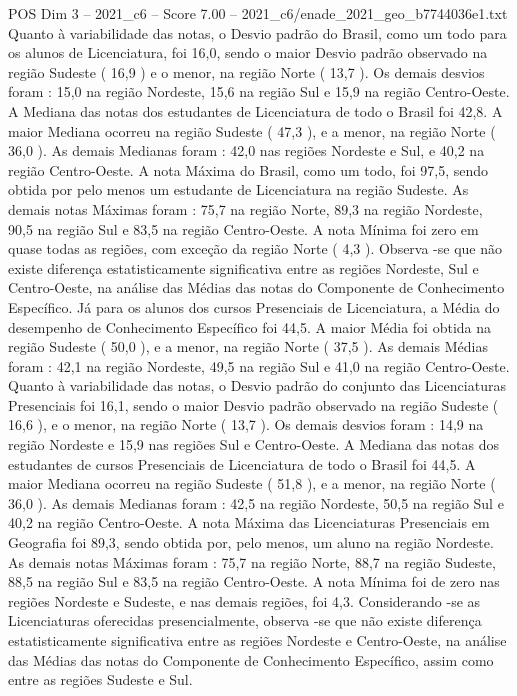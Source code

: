 \begin{textsample}{POS Dim 3 – 2021\_c6 – Score 7.00 – 2021\_c6/enade\_2021\_geo\_b7744036e1.txt}
Quanto à variabilidade das notas, o Desvio padrão do Brasil, como um todo para os alunos de Licenciatura, foi 16,0, sendo o maior Desvio padrão observado na região Sudeste ( 16,9 ) e o menor, na região Norte ( 13,7 ).
Os demais desvios foram : 15,0 na região Nordeste, 15,6 na região Sul e 15,9 na região Centro-Oeste.
A Mediana das notas dos estudantes de Licenciatura de todo o Brasil foi 42,8.
A maior Mediana ocorreu na região Sudeste ( 47,3 ), e a menor, na região Norte ( 36,0 ).
As demais Medianas foram : 42,0 nas regiões Nordeste e Sul, e 40,2 na região Centro-Oeste.
A nota Máxima do Brasil, como um todo, foi 97,5, sendo obtida por pelo menos um estudante de Licenciatura na região Sudeste.
As demais notas Máximas foram : 75,7 na região Norte, 89,3 na região Nordeste, 90,5 na região Sul e 83,5 na região Centro-Oeste.
A nota Mínima foi zero em quase todas as regiões, com exceção da região Norte ( 4,3 ).
Observa -se que não existe diferença estatisticamente significativa entre as regiões Nordeste, Sul e Centro-Oeste, na análise das Médias das notas do Componente de Conhecimento Específico.
Já para os alunos dos cursos Presenciais de Licenciatura, a Média do desempenho de Conhecimento Específico foi 44,5.
A maior Média foi obtida na região Sudeste ( 50,0 ), e a menor, na região Norte ( 37,5 ).
As demais Médias foram : 42,1 na região Nordeste, 49,5 na região Sul e 41,0 na região Centro-Oeste.
Quanto à variabilidade das notas, o Desvio padrão do conjunto das Licenciaturas Presenciais foi 16,1, sendo o maior Desvio padrão observado na região Sudeste ( 16,6 ), e o menor, na região Norte ( 13,7 ).
Os demais desvios foram : 14,9 na região Nordeste e 15,9 nas regiões Sul e Centro-Oeste.
A Mediana das notas dos estudantes de cursos Presenciais de Licenciatura de todo o Brasil foi 44,5.
A maior Mediana ocorreu na região Sudeste ( 51,8 ), e a menor, na região Norte ( 36,0 ).
As demais Medianas foram : 42,5 na região Nordeste, 50,5 na região Sul e 40,2 na região Centro-Oeste.
A nota Máxima das Licenciaturas Presenciais em Geografia foi 89,3, sendo obtida por, pelo menos, um aluno na região Nordeste.
As demais notas Máximas foram : 75,7 na região Norte, 88,7 na região Sudeste, 88,5 na região Sul e 83,5 na região Centro-Oeste.
A nota Mínima foi de zero nas regiões Nordeste e Sudeste, e nas demais regiões, foi 4,3.
Considerando -se as Licenciaturas oferecidas presencialmente, observa -se que não existe diferença estatisticamente significativa entre as regiões Nordeste e Centro-Oeste, na análise das Médias das notas do Componente de Conhecimento Específico, assim como entre as regiões Sudeste e Sul.

\end{textsample}
